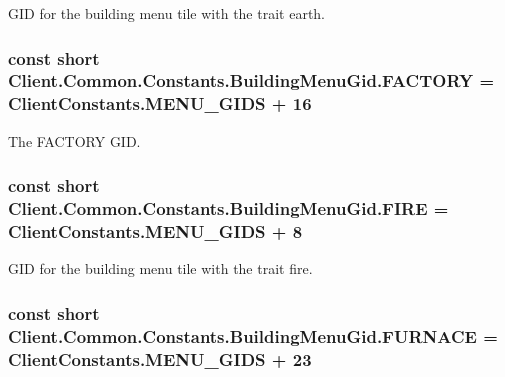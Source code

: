 G\+I\+D for the building menu tile with the trait earth. 

\hypertarget{classClient_1_1Common_1_1Constants_1_1BuildingMenuGid_a63fc76d8d22080156e156d588dc95be1}{}
\subsubsection[{F\+A\+C\+T\+O\+R\+Y}]{\setlength{\rightskip}{0pt plus 5cm}const short Client.\+Common.\+Constants.\+Building\+Menu\+Gid.\+F\+A\+C\+T\+O\+R\+Y = {\bf Client\+Constants.\+M\+E\+N\+U\+\_\+\+G\+I\+D\+S} + 16}\label{classClient_1_1Common_1_1Constants_1_1BuildingMenuGid_a63fc76d8d22080156e156d588dc95be1}


The F\+A\+C\+T\+O\+R\+Y G\+I\+D. 

\hypertarget{classClient_1_1Common_1_1Constants_1_1BuildingMenuGid_a31920e3fef30931467501afb53df9404}{}
\subsubsection[{F\+I\+R\+E}]{\setlength{\rightskip}{0pt plus 5cm}const short Client.\+Common.\+Constants.\+Building\+Menu\+Gid.\+F\+I\+R\+E = {\bf Client\+Constants.\+M\+E\+N\+U\+\_\+\+G\+I\+D\+S} + 8}\label{classClient_1_1Common_1_1Constants_1_1BuildingMenuGid_a31920e3fef30931467501afb53df9404}


G\+I\+D for the building menu tile with the trait fire. 

\hypertarget{classClient_1_1Common_1_1Constants_1_1BuildingMenuGid_a4f130c7786c07b2b4c38e6e1cb663aee}{}
\subsubsection[{F\+U\+R\+N\+A\+C\+E}]{\setlength{\rightskip}{0pt plus 5cm}const short Client.\+Common.\+Constants.\+Building\+Menu\+Gid.\+F\+U\+R\+N\+A\+C\+E = {\bf Client\+Constants.\+M\+E\+N\+U\+\_\+\+G\+I\+D\+S} + 23}\label{classClient_1_1Common_1_1Constants_1_1BuildingMenuGid_a4f130c7786c07b2b4c38e6e1cb663aee}


